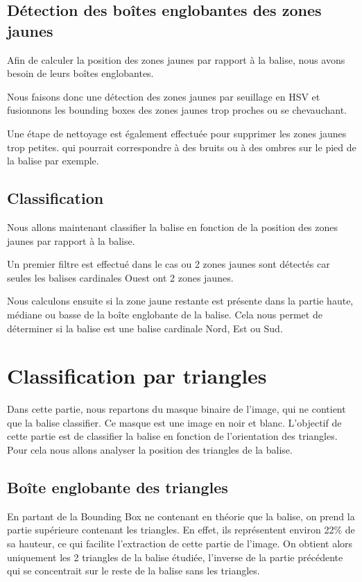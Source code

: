 \documentclass{article}
\begin{document}
\subsection{Détection des boîtes englobantes des zones jaunes}

Afin de calculer la position des zones jaunes par rapport à la balise, nous
avons besoin de leurs boîtes englobantes.

Nous faisons donc une détection des zones jaunes par seuillage en HSV et
fusionnons les bounding boxes des zones jaunes trop proches ou se chevauchant.

Une étape de nettoyage est également effectuée pour supprimer les zones jaunes
trop petites. qui pourrait correspondre à des bruits ou à des ombres sur le
pied de la balise par exemple.

\subsection{Classification}

Nous allons maintenant classifier la balise en fonction de la position des
zones jaunes par rapport à la balise.

Un premier filtre est effectué dans le cas ou 2 zones jaunes sont détectés car
seules les balises cardinales Ouest ont 2 zones jaunes.

Nous calculons ensuite si la zone jaune restante est présente dans la partie
haute, médiane ou basse de la boîte englobante de la balise. Cela nous permet
de déterminer si la balise est une balise cardinale Nord, Est ou Sud.

\section{Classification par triangles}

Dans cette partie, nous repartons du masque binaire de l’image, qui ne contient
que la balise classifier. Ce masque est une image en noir et blanc. L’objectif
de cette partie est de classifier la balise en fonction de l’orientation des
triangles. Pour cela nous allons analyser la position des triangles de la
balise.

\subsection{Boîte englobante des triangles}

En partant de la Bounding Box ne contenant en théorie que la balise, on prend
la partie supérieure contenant les triangles. En effet, ils représentent
environ 22\% de sa hauteur, ce qui facilite l’extraction de cette partie de
l’image. On obtient alors uniquement les 2 triangles de la balise étudiée,
l’inverse de la partie précédente qui se concentrait sur le reste de la balise
sans les triangles.
\end{document}
